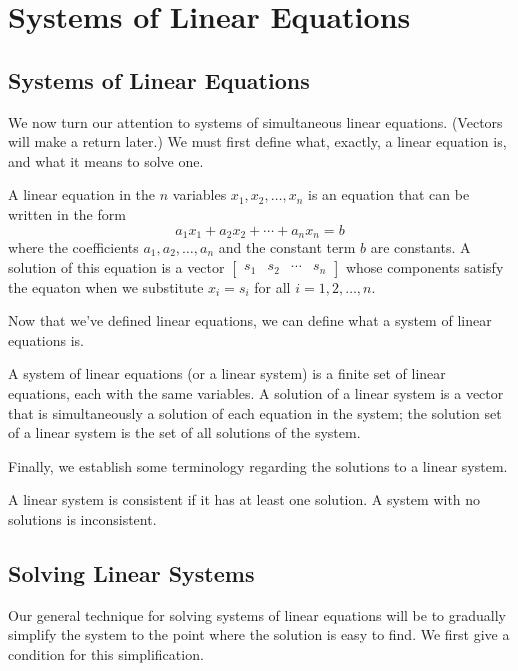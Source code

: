 \documentclass[../m073main.tex]{subfiles}
\begin{document}
\chapter{Systems of Linear Equations}

\section{Systems of Linear Equations}
We now turn our attention to systems of simultaneous linear equations.
(Vectors will make a return later.)
We must first define what, exactly, a linear equation is, and what it means to solve one.

\begin{definition}
	A linear equation in the $n$ variables $x_1, x_2, \ldots, x_n$ is an equation that can be written in the form
	\[ a_1 x_1 + a_2 x_2 + \cdots + a_n x_n = b \]
	where the coefficients $a_1, a_2, \ldots, a_n$ and the constant term $b$ are constants.
	A solution of this equation is a vector $\begin{bmatrix} s_1 & s_2 & \cdots & s_n \end{bmatrix}$ whose components satisfy the equaton when we substitute $x_i = s_i$ for all $i = 1, 2, \ldots, n$.
\end{definition}

Now that we've defined linear equations, we can define what a system of linear equations is.

\begin{definition}
	A system of linear equations (or a linear system) is a finite set of linear equations, each with the same variables.
	A solution of a linear system is a vector that is simultaneously a solution of each equation in the system; the solution set of a linear system is the set of all solutions of the system.
\end{definition}

Finally, we establish some terminology regarding the solutions to a linear system.

\begin{definition}
	A linear system is consistent if it has at least one solution.
	A system with no solutions is inconsistent.
\end{definition}

\section{Solving Linear Systems}
Our general technique for solving systems of linear equations will be to gradually simplify the system to the point where the solution is easy to find.
We first give a condition for this simplification.
\end{document}
